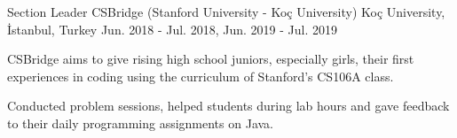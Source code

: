 
\vspace*{-1.5mm}

\begin{cventries}


    \cventry
    {Section Leader}%
    {CSBridge (Stanford University - Koç University)}%
    {Koç University, İstanbul, Turkey}
    {Jun. 2018 - Jul. 2018, Jun. 2019 - Jul. 2019}
    {
      \begin{cvitems}
        \item {CSBridge aims to give rising high school juniors, especially girls, their first experiences in coding using the curriculum of Stanford's CS106A class.} 	             
        \item{Conducted problem sessions, helped students during lab hours and gave feedback to their daily programming assignments on Java.}
      \end{cvitems}
    }


\end{cventries}

